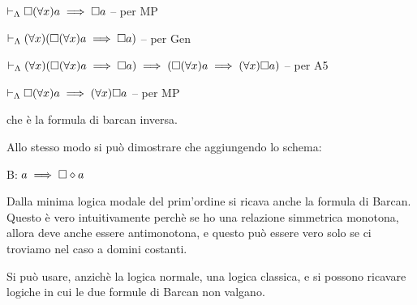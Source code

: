 $\vdash_{\Lambda}\square(\forall x)a\implies\square a$ -- per MP

$\vdash_{\Lambda}(\forall x)(\square(\forall x)a\implies\square a)$ -- per Gen

$\vdash_{\Lambda}(\forall x)(\square(\forall x)a\implies\square a)\implies(\square(\forall x)a\implies(\forall x)\square a)$
-- per A5 

$\vdash_{\Lambda}\square(\forall x)a\implies(\forall x)\square a$ -- per MP

che è la formula di barcan inversa.

Allo stesso modo si può dimostrare che aggiungendo lo schema:

B: $a\implies\square\diamond a$

Dalla minima logica modale del prim'ordine si ricava anche la formula
di Barcan. Questo è vero intuitivamente perchè se ho una relazione
simmetrica monotona, allora deve anche essere antimonotona, e questo
può essere vero solo se ci troviamo nel caso a domini costanti.

Si può usare, anzichè la logica normale, una logica classica, e si
possono ricavare logiche in cui le due formule di Barcan non valgano.
